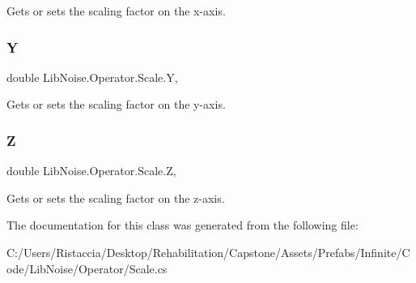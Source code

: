 Gets or sets the scaling factor on the x-\/axis. 

\mbox{\label{class_lib_noise_1_1_operator_1_1_scale_af5e3bff1fbf716cfc298c45530e21974}} 
\subsubsection{\texorpdfstring{Y}{Y}}
{\footnotesize\ttfamily double Lib\+Noise.\+Operator.\+Scale.\+Y\hspace{0.3cm}{\ttfamily [get]}, {\ttfamily [set]}}



Gets or sets the scaling factor on the y-\/axis. 

\mbox{\label{class_lib_noise_1_1_operator_1_1_scale_ab3a3eaf355fc76ecd167e2dce9878d76}} 
\subsubsection{\texorpdfstring{Z}{Z}}
{\footnotesize\ttfamily double Lib\+Noise.\+Operator.\+Scale.\+Z\hspace{0.3cm}{\ttfamily [get]}, {\ttfamily [set]}}



Gets or sets the scaling factor on the z-\/axis. 



The documentation for this class was generated from the following file\+:\begin{DoxyCompactItemize}
\item 
C\+:/\+Users/\+Ristaccia/\+Desktop/\+Rehabilitation/\+Capstone/\+Assets/\+Prefabs/\+Infinite/\+Code/\+Lib\+Noise/\+Operator/Scale.\+cs\end{DoxyCompactItemize}
